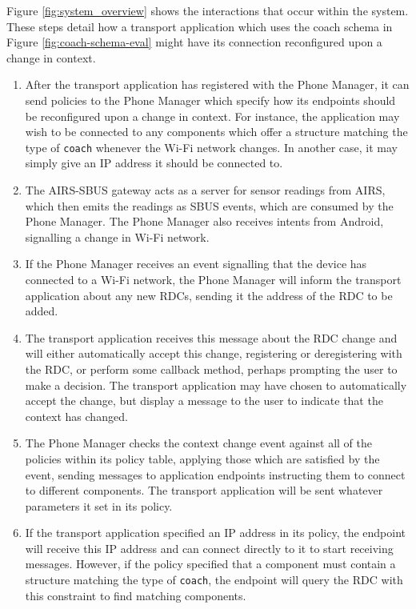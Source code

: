 \documentclass[12pt,twoside,notitlepage]{report}
\begin{document}
Figure \ref{fig:system_overview} shows the interactions that occur within the system. 
These steps detail how a transport application which uses the coach schema in Figure \ref{fig:coach-schema-eval} might have its connection reconfigured upon a change in context. 

\begin{enumerate}

\item After the transport application has registered with the Phone Manager, it can send policies to the Phone Manager which specify how its endpoints should be reconfigured upon a change in context. For instance, the application may wish to be connected to any components which offer a structure matching the type of {\tt coach} whenever the Wi-Fi network changes. In another case, it may simply give an IP address it should be connected to.

\item The AIRS-SBUS gateway acts as a server for sensor readings from AIRS, which then emits the readings as SBUS events, which are consumed by the Phone Manager. The Phone Manager also receives intents from Android, signalling a change in Wi-Fi network.

\item If the Phone Manager receives an event signalling that the device has connected to a Wi-Fi network, the Phone Manager will inform the transport application about any new RDCs, sending it the address of the RDC to be added. 

\item The transport application receives this message about the RDC change and will either automatically accept this change, registering or deregistering with the RDC, or perform some callback method, perhaps prompting the user to make a decision. The transport application may have chosen to automatically accept the change, but display a message to the user to indicate that the context has changed.

\item The Phone Manager checks the context change event against all of the policies within its policy table, applying those which are satisfied by the event, sending messages to application endpoints instructing them to connect to different components. The transport application will be sent whatever parameters it set in its policy.

\item If the transport application specified an IP address in its policy, the endpoint will receive this IP address and can connect directly to it to start receiving messages. However, if the policy specified that a component must contain a structure matching the type of {\tt coach}, the endpoint will query the RDC with this constraint to find matching components.


\end{enumerate}
\end{document}
